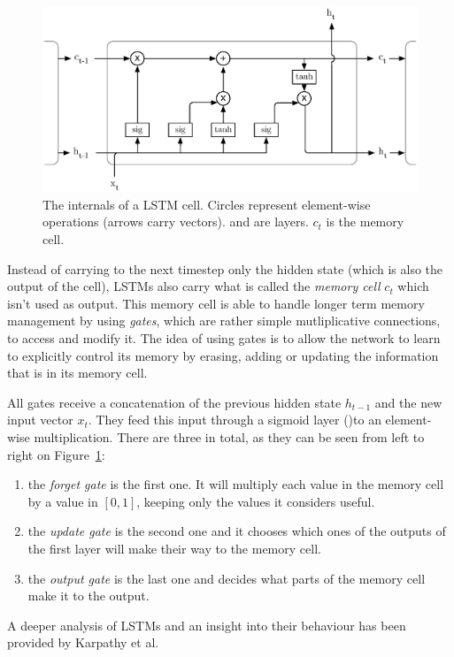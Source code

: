\begin{figure}
	\centering
	\includegraphics[width=0.8\linewidth]{fig/lstm.eps}
	\caption{The internals of a LSTM cell. Circles represent element-wise
	operations (arrows carry vectors).  and 
	 are layers. $c_t$ is the memory cell.}
	\label{fig:lstm}
\end{figure}

Instead of carrying to the next timestep only the hidden state (which is also
the output of the cell), LSTMs also carry what is called the
\textit{memory cell} $c_t$ which isn't used as output. This memory cell is 
able to handle longer term memory management by using \textit{gates}, which
are rather simple mutliplicative connections, to 
access and modify it. The idea of using gates is to allow the network
to learn to explicitly control its memory by erasing, adding or updating the
information that is in its memory cell.

All gates receive a concatenation of the previous hidden
state $h_{t-1}$ and the new input vector $x_t$. They feed this input through a
sigmoid layer ()to an element-wise multiplication. There are 
three in total, as they can be seen from left to right on Figure~\ref{fig:lstm}:
\begin{enumerate}
	\item the \textit{forget gate} is the first one. It will multiply each
		value in the memory cell by a value in $[0, 1]$, keeping only
		the values it considers useful.
	\item the \textit{update gate} is the second one and it chooses which
		ones of the outputs of the first  layer will
		make their way to the memory cell.
	\item the \textit{output gate} is the last one and decides what parts
		of the memory cell make it to the output.
\end{enumerate}
A deeper analysis of LSTMs and an insight into their behaviour has been
provided by Karpathy et al. \cite{lstm-analysis}



